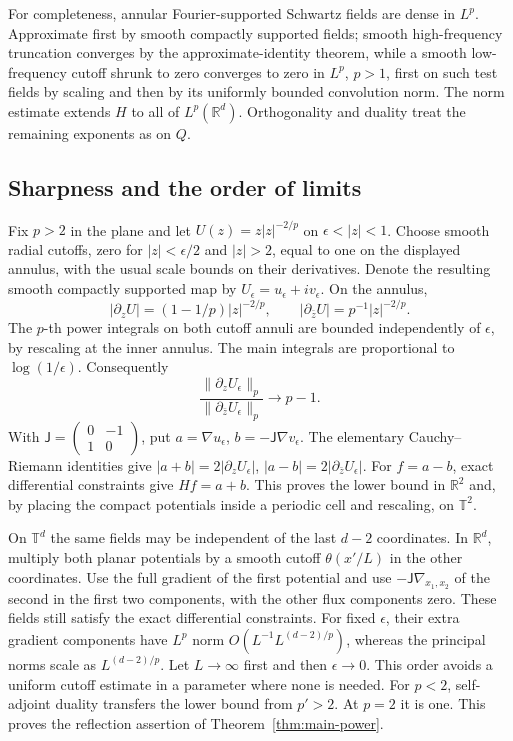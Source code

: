 \documentclass[11pt,a4paper]{article}
\numberwithin{equation}{section}
\theoremstyle{definition}
\theoremstyle{remark}\newtheorem{remark}[theorem]{Remark}
\newcommand{\R}{\mathbb R}
\newcommand{\T}{\mathbb T}
\newcommand{\norm}[1]{\lVert #1\rVert}
\newcommand{\Rot}{\mathsf J}
\begin{document}
For completeness, annular Fourier-supported Schwartz fields are dense
in \(L^p\). Approximate first by smooth compactly supported fields;
smooth high-frequency truncation converges by the approximate-identity
theorem, while a smooth low-frequency cutoff shrunk to zero converges
to zero in \(L^p\), \(p>1\), first on such test fields by scaling and
then by its uniformly bounded convolution norm. The norm estimate
extends \(H\) to all of \(L^p(\R^d)\). Orthogonality and duality
treat the remaining exponents as on \(Q\).

\subsection{Sharpness and the order of limits}\label{subsec:reflection-sharp}

Fix \(p>2\) in the plane and let
\(U(z)=z|z|^{-2/p}\) on \(\epsilon<|z|<1\).
Choose smooth radial cutoffs, zero for \(|z|<\epsilon/2\) and
\(|z|>2\), equal to one on the displayed annulus, with the usual
scale bounds on their derivatives. Denote the resulting smooth
compactly supported map by \(U_\epsilon=u_\epsilon+iv_\epsilon\).
On the annulus,
\[
 |\partial_zU|=(1-1/p)|z|^{-2/p},\qquad
 |\partial_{\bar z}U|=p^{-1}|z|^{-2/p}.
\]
The \(p\)-th power integrals on both cutoff annuli are bounded
independently of \(\epsilon\), by rescaling at the inner annulus.
The main integrals are proportional to \(\log(1/\epsilon)\).
Consequently
\[
 \frac{\norm{\partial_zU_\epsilon}_p}
      {\norm{\partial_{\bar z}U_\epsilon}_p}\longrightarrow p-1.
\]
With \(\Rot=\left(\begin{smallmatrix}0&-1\\1&0\end{smallmatrix}\right)\),
put \(a=\nabla u_\epsilon\), \(b=-\Rot\nabla v_\epsilon\).
The elementary Cauchy--Riemann identities give
\(|a+b|=2|\partial_zU_\epsilon|\),
\(|a-b|=2|\partial_{\bar z}U_\epsilon|\).
For \(f=a-b\), exact differential constraints give \(Hf=a+b\).
This proves the lower bound in \(\R^2\) and, by placing the compact
potentials inside a periodic cell and rescaling, on \(\T^2\).

On \(\T^d\) the same fields may be independent of the last \(d-2\)
coordinates. In \(\R^d\), multiply both planar potentials by a smooth
cutoff \(\theta(x'/L)\) in the other coordinates. Use the full gradient
of the first potential and use \(-\Rot\nabla_{x_1,x_2}\) of the second
in the first two components, with the other flux components zero.
These fields still satisfy the exact differential constraints.
For fixed \(\epsilon\), their extra gradient components have
\(L^p\) norm \(O(L^{-1}L^{(d-2)/p})\), whereas the principal norms
scale as \(L^{(d-2)/p}\). Let \(L\to\infty\) first and then
\(\epsilon\to0\). This order avoids a uniform cutoff estimate
in a parameter where none is needed.
For \(p<2\), self-adjoint duality transfers the lower bound from \(p'>2\).
At \(p=2\) it is one. This proves the reflection assertion of
Theorem~\ref{thm:main-power}.
\end{document}
